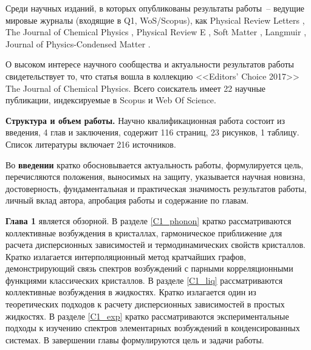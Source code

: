 Среди научных изданий, в которых опубликованы результаты работы~-- ведущие мировые журналы (входящие в Q1, WoS/Scopus), как
Physical Review Letters \cite{10.1103/PhysRevLett.121.075003}, The Journal of Chemical Physics \cite{10.1063/1.4926945, 10.1063/1.5022969, 10.1063/1.4921223, 10.1063/1.4979325, 10.1063/1.5050708, 10.1063/1.5088141, 10.1063/1.5082785}, Physical Review E
\cite{10.1103/PhysRevE.97.022616, 10.1103/PhysRevE.96.043201}, Soft Matter \cite{10.1039/C7SM02429K, 10.1039/c8sm01836g}, %
Langmuir \cite{10.1021/acs.langmuir.6b01644}, Journal of Physics-Condensed Matter \cite{10.1088/0953-8984/28/23/235401}.

О высоком интересе научного сообщества и актуальности результатов работы свидетельствует то, что
статья \cite{10.1063/1.4979325} вошла в коллекцию <<Editors’ Choice 2017>> The Journal of Chemical Physics.
Всего соискатель имеет 22 научные публикации, индексируемые в Scopus и Web Of Science.

\textbf{Структура и объем работы.} Научно квалификационная работа состоит из введения, 4 глав и заключения, содержит 116 страниц, 23 рисунков, 1 таблицу.
Список литературы включает 216 источников.

Во \textbf{введении} кратко обосновывается актуальность работы, формулируется цель, перечисляются положения, выносимых на защиту, указывается научная новизна, достоверность, фундаментальная и практическая значимость результатов работы, личный вклад автора, апробация работы и содержание по главам.

\textbf{Глава 1} является обзорной.
В разделе \ref{C1_phonon} кратко рассматриваются коллективные возбуждения в кристаллах, гармоническое приближение для расчета дисперсионных зависимостей и термодинамических свойств кристаллов.
Кратко излагается интерполяционный метод кратчайших графов, демонстрирующий связь спектров возбуждений с парными корреляционными функциями классических кристаллов.
В разделе \ref{C1_liq} рассматриваются коллективные возбуждения в жидкостях. Кратко излагается один из теоретических подходов к расчету дисперсионных зависимостей в простых жидкостях.
В разделе \ref{C1_exp} кратко рассматриваются экспериментальные подходы к изучению спектров элементарных возбуждений в конденсированных системах.
В завершении главы формулируются цель и задачи работы.


